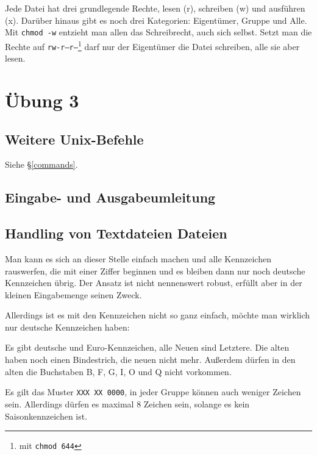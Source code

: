 \documentclass[12pt]{report}
\begin{document}
Jede Datei hat drei grundlegende Rechte, lesen (r), schreiben (w) und ausführen (x). Darüber hinaus gibt es noch drei Kategorien: Eigentümer, Gruppe und Alle. Mit \texttt{chmod -w} entzieht man allen das Schreibrecht, auch sich selbst. Setzt man die Rechte auf \texttt{rw-r--r--}\footnote{mit \texttt{chmod 644}} darf nur der Eigentümer die Datei schreiben, alle sie aber lesen.

\chapter{Übung 3}

\section{Weitere Unix-Befehle}

Siehe §\ref{commands}.

\section{Eingabe- und Ausgabeumleitung}



\section{Handling von Textdateien Dateien}

Man kann es sich an dieser Stelle einfach machen und alle Kennzeichen rauswerfen, die mit einer Ziffer beginnen und es bleiben dann nur noch deutsche Kennzeichen übrig. Der Ansatz ist nicht nennenswert robust, erfüllt aber in der kleinen Eingabemenge seinen Zweck.





Allerdings ist es mit den Kennzeichen nicht so ganz einfach, möchte man wirklich nur deutsche Kennzeichen haben:

Es gibt deutsche und Euro-Kennzeichen, alle Neuen sind Letztere. Die alten haben noch einen Bindestrich, die neuen nicht mehr. Außerdem dürfen in den alten die Buchstaben B, F, G, I, O und Q nicht vorkommen.\cite{wiki-kfz}

Es gilt das Muster \texttt{XXX XX 0000}, in jeder Gruppe können auch weniger Zeichen sein. Allerdings dürfen es maximal 8 Zeichen sein, solange es kein Saisonkennzeichen ist.
\end{document}
